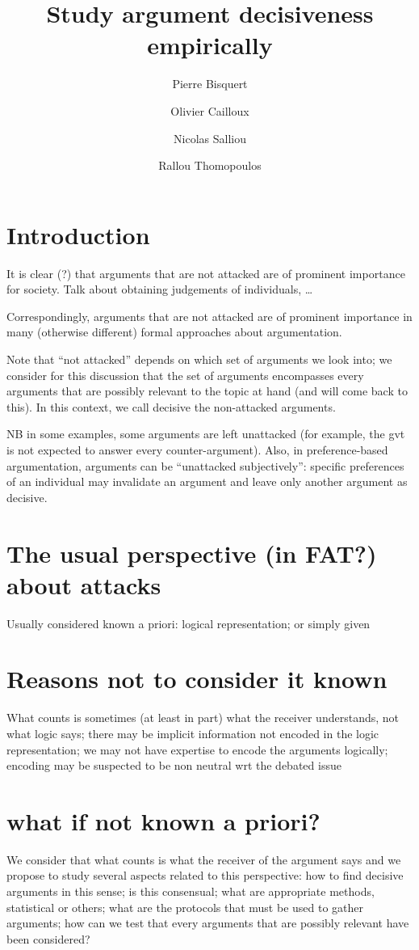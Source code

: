\documentclass[version=3.21, pagesize, twoside=off, bibliography=totoc, DIV=calc, fontsize=12pt, a4paper]{scrartcl}
\title{Study argument decisiveness empirically}
\author{Pierre Bisquert}
\affil{Affiliation}
\author{Olivier Cailloux}
\affil{Université Paris-Dauphine, PSL Research University, CNRS, LAMSADE, 75016 PARIS, FRANCE\\
	\href{mailto:olivier.cailloux@dauphine.fr}{olivier.cailloux@dauphine.fr}
}
\author{Nicolas Salliou}
\affil{Affiliation}
\author{Rallou Thomopoulos}
\affil{Affiliation}
\begin{document}
\maketitle

\section{Introduction}
\label{sec:intro}
It is clear (?) that arguments that are not attacked are of prominent importance for society. Talk about obtaining judgements of individuals, …

Correspondingly, arguments that are not attacked are of prominent importance in many (otherwise different) formal approaches about argumentation. 

Note that “not attacked” depends on which set of arguments we look into; we consider for this discussion that the set of arguments encompasses every arguments that are possibly relevant to the topic at hand (and will come back to this). In this context, we call decisive the non-attacked arguments. 

NB in some examples, some arguments are left unattacked (for example, the gvt is not expected to answer every counter-argument). Also, in preference-based argumentation, arguments can be “unattacked subjectively”: specific preferences of an individual may invalidate an argument and leave only another argument as decisive.

\section{The usual perspective (in FAT?) about attacks}
Usually considered known a priori: logical representation; or simply given

\section{Reasons not to consider it known}
What counts is sometimes (at least in part) what the receiver understands, not what logic says; there may be implicit information not encoded in the logic representation; we may not have expertise to encode the arguments logically; encoding may be suspected to be non neutral wrt the debated issue

\section{what if not known a priori?}
We consider that what counts is what the receiver of the argument says and we propose to study several aspects related to this perspective: how to find decisive arguments in this sense; is this consensual; what are appropriate methods, statistical or others; what are the protocols that must be used to gather arguments; how can we test that every arguments that are possibly relevant have been considered?
\end{document}
